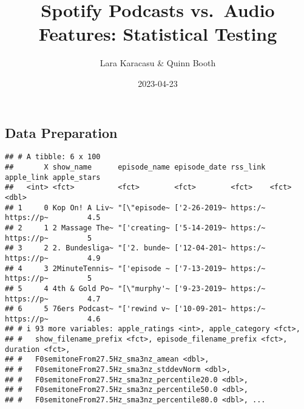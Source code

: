 \documentclass[
]{article}
\title{Spotify Podcasts vs.~Audio Features: Statistical Testing}
\author{Lara Karacasu \& Quinn Booth}
\date{2023-04-23}
\newenvironment{Shaded}{\begin{snugshade}}{\end{snugshade}}
\newcommand{\AttributeTok}[1]{\textcolor[rgb]{0.77,0.63,0.00}{#1}}
\newcommand{\CommentTok}[1]{\textcolor[rgb]{0.56,0.35,0.01}{\textit{#1}}}
\newcommand{\DecValTok}[1]{\textcolor[rgb]{0.00,0.00,0.81}{#1}}
\newcommand{\FunctionTok}[1]{\textcolor[rgb]{0.00,0.00,0.00}{#1}}
\newcommand{\NormalTok}[1]{#1}
\newcommand{\OtherTok}[1]{\textcolor[rgb]{0.56,0.35,0.01}{#1}}
\newcommand{\SpecialCharTok}[1]{\textcolor[rgb]{0.00,0.00,0.00}{#1}}
\newcommand{\StringTok}[1]{\textcolor[rgb]{0.31,0.60,0.02}{#1}}
\begin{document}
\maketitle

\hypertarget{data-preparation}{%
\subsection{Data Preparation}\label{data-preparation}}

\begin{Shaded}
\end{Shaded}

\begin{verbatim}
## # A tibble: 6 x 100
##       X show_name      episode_name episode_date rss_link apple_link apple_stars
##   <int> <fct>          <fct>        <fct>        <fct>    <fct>            <dbl>
## 1     0 Kop On! A Liv~ "[\"episode~ ['2-26-2019~ https:/~ https://p~         4.5
## 2     1 2 Massage The~ "['creating~ ['5-14-2019~ https:/~ https://p~         5  
## 3     2 2. Bundesliga~ "['2. bunde~ ['12-04-201~ https:/~ https://p~         4.9
## 4     3 2MinuteTennis~ "['episode ~ ['7-13-2019~ https:/~ https://p~         5  
## 5     4 4th & Gold Po~ "[\"murphy'~ ['9-23-2019~ https:/~ https://p~         4.7
## 6     5 76ers Podcast~ "['rewind v~ ['10-09-201~ https:/~ https://p~         4.6
## # i 93 more variables: apple_ratings <int>, apple_category <fct>,
## #   show_filename_prefix <fct>, episode_filename_prefix <fct>, duration <fct>,
## #   F0semitoneFrom27.5Hz_sma3nz_amean <dbl>,
## #   F0semitoneFrom27.5Hz_sma3nz_stddevNorm <dbl>,
## #   F0semitoneFrom27.5Hz_sma3nz_percentile20.0 <dbl>,
## #   F0semitoneFrom27.5Hz_sma3nz_percentile50.0 <dbl>,
## #   F0semitoneFrom27.5Hz_sma3nz_percentile80.0 <dbl>, ...
\end{verbatim}
\end{document}
